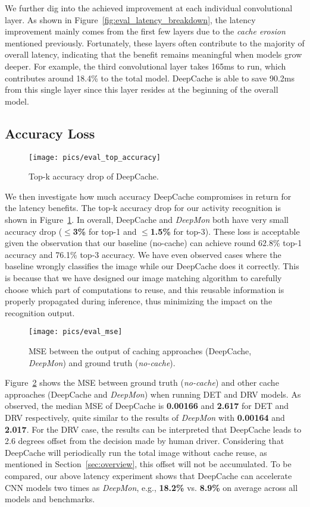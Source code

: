 \documentclass[10pt,acmtog]{acmart}
\newcommand{\framework}{DeepCache\xspace}
\newcommand{\shrink}{\emph{cache erosion}\xspace}
\begin{document}
We further dig into the achieved improvement at each individual convolutional layer.
As shown in Figure~\ref{fig:eval_latency_breakdown}, the latency improvement mainly comes from the first few layers due to the \shrink mentioned previously.
Fortunately, these layers often contribute to the majority of overall latency, indicating that the benefit remains meaningful when models grow deeper.
For example, the third convolutional layer takes 165ms to run, which contributes around 18.4\% to the total model.
\framework is able to save 90.2ms from this single layer since this layer resides at the beginning of the overall model.

\subsection{Accuracy Loss}\begin{figure}[t]
	\centering
	\texttt{[image: pics/eval\_top\_accuracy]}
	\caption{Top-k accuracy drop of \framework.}
	\label{fig:eval_top_accuracy}
\end{figure}
We then investigate how much accuracy \framework compromises in return for the latency benefits.
The top-k accuracy drop for our activity recognition is shown in Figure~\ref{fig:eval_top_accuracy}.
In overall, \framework and \emph{DeepMon} both have very small accuracy drop ($\leqslant$\textbf{3\%} for top-1 and $\leqslant$\textbf{1.5\%} for top-3).
These loss is acceptable given the observation that our baseline (no-cache) can achieve round 62.8\% top-1 accuracy and 76.1\% top-3 accuracy.
We have even observed cases where the baseline wrongly classifies the image while our \framework does it correctly.
This is because that we have designed our image matching algorithm to carefully choose which part of computations to reuse, and this reusable information is properly propagated during inference, thus minimizing the impact on the recognition output.

\begin{figure}[t]
	\centering
	\texttt{[image: pics/eval\_mse]}
	\caption{MSE between the output of caching approaches (\framework, \emph{DeepMon}) and ground truth (\emph{no-cache}).}
	\label{fig:eval_ed_accuracy}
\end{figure}Figure~\ref{fig:eval_ed_accuracy} shows the MSE between ground truth (\emph{no-cache}) and other cache approaches (\framework and \emph{DeepMon}) when running DET and DRV models.
As observed, the median MSE of \framework is \textbf{0.00166} and \textbf{2.617} for DET and DRV respectively, quite similar to the results of \emph{DeepMon} with \textbf{0.00164} and \textbf{2.017}.
For the DRV case, the results can be interpreted that \framework leads to 2.6 degrees offset from the decision made by human driver.
Considering that \framework will periodically run the total image without cache reuse, as mentioned in Section~\ref{sec:overview}, this offset will not be accumulated.
To be compared, our above latency experiment shows that \framework can accelerate CNN models two times as \emph{DeepMon}, e.g., \textbf{18.2\%} vs. \textbf{8.9\%} on average across all models and benchmarks.
\end{document}
